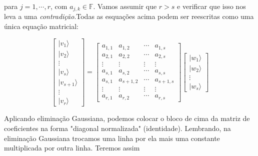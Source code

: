 \documentclass[11pt]{article}
\begin{document}
para \(j=1,\cdots,r\), com \(a_{j,k}\in\mathbb{F}\). Vamos assumir que
\(r>s\) e verificar que isso nos leva a uma \emph{contradição}.Todas as
esquações acima podem ser reescritas como uma única equação matricial:

\begin{equation}
\begin{bmatrix} |v_{1}\rangle \\ |v_{2}\rangle \\ \vdots \\ |v_{s}\rangle \\ |v_{s+1}\rangle \\ \vdots \\ |v_{r}\rangle \end{bmatrix}
= \begin{bmatrix} a_{1,1} & a_{1,2} & \cdots & a_{1,s} \\  a_{2,1} & a_{2,2} & \cdots & a_{2,s} \\ \vdots & \vdots & \vdots & \vdots \\ a_{s,1} & a_{s,2} & \cdots & a_{s,s} \\ a_{s,1} & a_{s+1,2} & \cdots & a_{s+1,s} \\  \vdots & \vdots & \vdots & \vdots  \\ a_{r,1} & a_{r,2} & \cdots & a_{r,s} \end{bmatrix}\begin{bmatrix} |w_{1}\rangle \\ |w_{2}\rangle \\ \vdots \\ |w_{s}\rangle \end{bmatrix}
\end{equation}

    Aplicando eliminação Gaussiana, podemos colocar o bloco de cima da
matriz de coeficientes na forma "diagonal normalizada" (identidade).
Lembrando, na eliminação Gaussiana trocamos uma linha por ela mais uma
constante multiplicada por outra linha. Teremos assim
\end{document}
